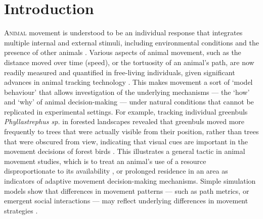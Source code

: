 \newpage

\section*{Introduction}

\lettrine{A}{nimal} movement is understood to be an individual response that integrates multiple internal and external stimuli, including environmental conditions and the presence of other animals \citep{nathan2008a}.
Various aspects of animal movement, such as the distance moved over time (speed), or the tortuosity of an animal's path, are now readily measured and quantified in free-living individuals, given significant advances in animal tracking technology \citep[][see Nathan et al. \textit{in prep.}]{cagnacci2010}.
This makes movement a sort of `model behaviour' that allows investigation of the underlying mechanisms --- the `how' and `why' of animal decision-making --- under natural conditions that cannot be replicated in experimental settings.
For example, tracking individual greenbuls \textit{Phyllastrephus sp.} in forested landscapes revealed that greenbuls moved more frequently to trees that were actually visible from their position, rather than trees that were obscured from view, indicating that visual cues are important in the movement decisions of forest birds \citep[][see also \citep{aben2018}]{aben2021}.
This illustrates a general tactic in animal movement studies, which is to treat an animal's use of a resource disproportionate to its availability \citep{manly2007,fortin2005,signer2019}, or prolonged residence in an area \citep{bracis2018} as indicators of adaptive movement decision-making mechanisms.
Simple simulation models show that differences in movement patterns --- such as path metrics, or emergent social interactions --- may reflect underlying differences in movement strategies \citep{spiegel2017,stuber2022,spiegel2022}.

